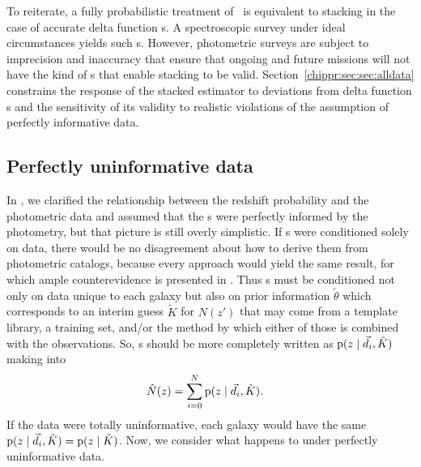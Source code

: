 To reiterate, a fully probabilistic treatment of \Nz\ is equivalent to stacking in the case of accurate delta function \pzpdf s.
A spectroscopic survey under ideal circumstances yields such \pzpdf s.
However, photometric surveys are subject to imprecision and inaccuracy that ensure that ongoing and future missions will not have the kind of \pzpdf s that enable stacking to be valid.
Section~\ref{chippr:sec:sec:alldata} constrains the response of the stacked estimator to deviations from delta function \pzpdf s and the sensitivity of its validity to realistic violations of the assumption of perfectly informative data.

\subsection{Perfectly uninformative data}

In , we clarified the relationship between the redshift probability and the photometric data and assumed that the \pzpdf s were perfectly informed by the photometry, but that picture is still overly simplistic.
If \pzpdf s were conditioned solely on data, there would be no disagreement about how to derive them from photometric catalogs, because every approach would yield the same result, for which ample counterevidence is presented in .
Thus \pzpdf s must be conditioned not only on data unique to each galaxy but also on prior information $\tilde{\theta}$ which corresponds to an interim guess $\tilde{K}$ for $N(z')$ that may come from a template library, a training set, and/or the method by which either of those is combined with the observations.
So, \pzpdf s should be more completely written as $\mathrm{p}(z \mid \vec{d}_{i}, \tilde{K})$ making  into
\begin{align}
\eqlabel{eqn:stackwithprior}
\hat{N}(z) &= \sum_{i = 0}^{N} \pr{z \gvn \data_{i}, \tilde{K}} .
\end{align}
If the data were totally uninformative, each galaxy would have the same $\mathrm{p}(z \mid \vec{d}_{i}, \tilde{K}) = \mathrm{p}(z \mid \tilde{K})$.
Now, we consider what happens to  under perfectly uninformative data.

